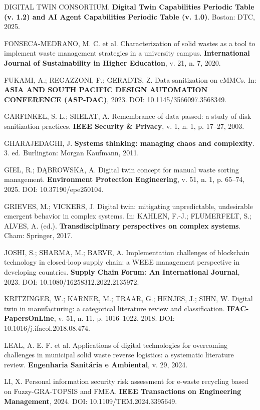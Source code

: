 \documentclass[12pt,a4paper,article,oneside,brazil,english]{abntex2}
\begin{document}
DIGITAL TWIN CONSORTIUM. \textbf{Digital Twin Capabilities Periodic Table (v. 1.2) and AI Agent Capabilities Periodic Table (v. 1.0)}. Boston: DTC, 2025.

FONSECA-MEDRANO, M. C. et al. Characterization of solid wastes as a tool to implement waste management strategies in a university campus. \textbf{International Journal of Sustainability in Higher Education}, v. 21, n. 7, 2020.

FUKAMI, A.; REGAZZONI, F.; GERADTS, Z. Data sanitization on eMMCs. In: \textbf{ASIA AND SOUTH PACIFIC DESIGN AUTOMATION CONFERENCE (ASP-DAC)}, 2023. DOI: 10.1145/3566097.3568349.

GARFINKEL, S. L.; SHELAT, A. Remembrance of data passed: a study of disk sanitization practices. \textbf{IEEE Security \& Privacy}, v. 1, n. 1, p. 17--27, 2003.

GHARAJEDAGHI, J. \textbf{Systems thinking: managing chaos and complexity}. 3. ed. Burlington: Morgan Kaufmann, 2011.

GIEL, R.; DĄBROWSKA, A. Digital twin concept for manual waste sorting management. \textbf{Environment Protection Engineering}, v. 51, n. 1, p. 65--74, 2025. DOI: 10.37190/epe250104.

GRIEVES, M.; VICKERS, J. Digital twin: mitigating unpredictable, undesirable emergent behavior in complex systems. In: KAHLEN, F.-J.; FLUMERFELT, S.; ALVES, A. (ed.). \textbf{Transdisciplinary perspectives on complex systems}. Cham: Springer, 2017.

JOSHI, S.; SHARMA, M.; BARVE, A. Implementation challenges of blockchain technology in closed-loop supply chain: a WEEE management perspective in developing countries. \textbf{Supply Chain Forum: An International Journal}, 2023. DOI: 10.1080/16258312.2022.2135972.

KRITZINGER, W.; KARNER, M.; TRAAR, G.; HENJES, J.; SIHN, W. Digital twin in manufacturing: a categorical literature review and classification. \textbf{IFAC-PapersOnLine}, v. 51, n. 11, p. 1016--1022, 2018. DOI: 10.1016/j.ifacol.2018.08.474.

LEAL, A. E. F. et al. Applications of digital technologies for overcoming challenges in municipal solid waste reverse logistics: a systematic literature review. \textbf{Engenharia Sanitária e Ambiental}, v. 29, 2024.

LI, X. Personal information security risk assessment for e-waste recycling based on Fuzzy-GRA-TOPSIS and FMEA. \textbf{IEEE Transactions on Engineering Management}, 2024. DOI: 10.1109/TEM.2024.3395649.
\end{document}
